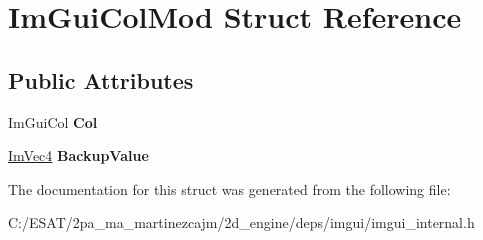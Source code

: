 \hypertarget{struct_im_gui_col_mod}{}\section{Im\+Gui\+Col\+Mod Struct Reference}
\label{struct_im_gui_col_mod}
\subsection*{Public Attributes}
\begin{DoxyCompactItemize}
\item 
\mbox{\label{struct_im_gui_col_mod_aaa66ad29c378b8800098ab4d4e1c91a6}} 
Im\+Gui\+Col {\bfseries Col}
\item 
\mbox{\label{struct_im_gui_col_mod_a7c23f178bbf5cbdb1333332bb84f73c9}} 
\hyperlink{struct_im_vec4}{Im\+Vec4} {\bfseries Backup\+Value}
\end{DoxyCompactItemize}


The documentation for this struct was generated from the following file\+:\begin{DoxyCompactItemize}
\item 
C\+:/\+E\+S\+A\+T/2pa\+\_\+ma\+\_\+martinezcajm/2d\+\_\+engine/deps/imgui/imgui\+\_\+internal.\+h\end{DoxyCompactItemize}
